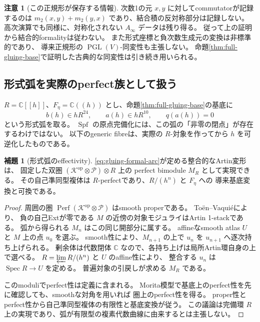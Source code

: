 \documentclass[a4paper,11pt]{ltjsarticle}
\theoremstyle{definition}
\newtheorem{lemma}[theorem]{補題}
\newtheorem{remark}[theorem]{注意}
\newcommand{\CC}{\mathbb C}
\newcommand{\Spf}{\operatorname{Spf}}
\newcommand{\Perf}{\operatorname{Perf}}
\begin{document}
\begin{remark}[この正規形が保存する情報]
次数1の元 $x,y$ に対してcommutatorが記録するのは
$m_2(x,y)+m_2(y,x)$ であり、結合積の反対称部分は記録しない。
高次演算でも同様に、対称化されない $A_\infty$ データは残り得る。
従って上の証明から結合的formalityは従わない。
また形式座標と負次数生成元の変換は非標準的であり、
導来正規形の $\operatorname{PGL}(V)$-同変性も主張しない。
命題\ref{thm:full-gluing-base}で証明した古典的な同変性は引き続き用いられる。
\end{remark}

\subsection{形式弧を実際のperfect族として扱う}

$R=\CC[[h]]$、$F_\eta=\CC((h))$ とし、命題\ref{thm:full-gluing-base}の基底に
\begin{equation}\label{eq:gluing-formal-arc}
 b(h)\in hR^{24},\qquad a(h)\in hR^{10},\qquad q(a(h))=0
\end{equation}
という形式弧を取る。
$\Spf$ の原点完備化には、この弧の「非零の閉点」が存在するわけではない。
以下のgeneric fibreは、実際の $R$-対象を作ってから $h$ を可逆化したものである。

\begin{lemma}[形式弧のeffectivity]\label{lem:gluing-arc-effective}
\eqref{eq:gluing-formal-arc}が定める整合的なArtin変形は、
固定した双圏 $(\mathcal K^{\mathrm{op}}\otimes\mathcal P)\otimes R$ 上の
perfect bimodule $M_R$ として実現できる。
その自己準同型複体は $R$-perfectであり、$R/(h^n)$ と $F_\eta$ への
導来基底変換と可換である。
\end{lemma}

\begin{proof}
周囲の圏 $\Perf(\mathcal K^{\mathrm{op}}\otimes\mathcal P)$ はsmooth properである。
Toën--Vaquié\cite[Theorem 3.6, Corollaries 3.15, 3.21--3.22]{TV}により、
負の自己Extが零である $M$ の近傍の対象モジュライはArtin 1-stackである。
弧から得られる $M_n$ はこの同じ開部分に属する。
affineなsmooth atlas $U$ と $M$ 上の点 $u_0$ を選ぶ。
smooth性により、$M_{n+1}$ の上で $u_n$ を $u_{n+1}$ へ逐次持ち上げられる。
剰余体は代数閉体 $\CC$ なので、各持ち上げは局所Artin環自身の上で選べる。
$R=\varprojlim R/(h^n)$ と $U$ のaffine性により、
整合する $u_n$ は $\operatorname{Spec}R\to U$ を定める。
普遍対象の引戻しが求める $M_R$ である。

このmoduliでperfect性は定義に含まれる。
Morita模型で基底上のperfect性を先に確認しても、smoothな対角を用いれば
圏上のperfect性を得る\cite[Lemma 2.8]{TV}。
proper性とperfect性から自己準同型複体の有限性と基底変換が従う。
この議論は完備環 $R$ 上の実現であり、弧が有限型の複素代数曲線に由来するとは主張しない。
\end{proof}
\end{document}
